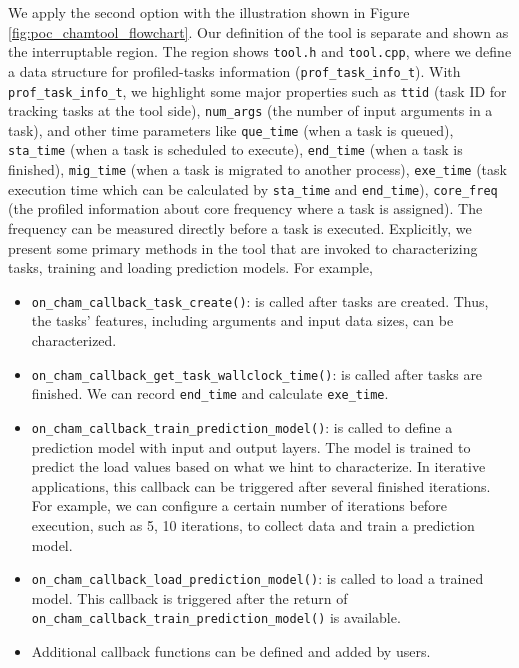 We apply the second option with the illustration shown in Figure \ref{fig:poc_chamtool_flowchart}. Our definition of the tool is separate and shown as the interruptable region. The region shows \texttt{tool.h} and \texttt{tool.cpp}, where we define a data structure for profiled-tasks information (\texttt{prof\_task\_info\_t}). With \texttt{prof\_task\_info\_t}, we highlight some major properties such as \texttt{ttid} (task ID for tracking tasks at the tool side), \texttt{num\_args} (the number of input arguments in a task), and other time parameters like \texttt{que\_time} (when a task is queued), \texttt{sta\_time} (when a task is scheduled to execute), \texttt{end\_time} (when a task is finished), \texttt{mig\_time} (when a task is migrated to another process), \texttt{exe\_time} (task execution time which can be calculated by \texttt{sta\_time} and \texttt{end\_time}), \texttt{core\_freq} (the profiled information about core frequency where a task is assigned). The frequency can be measured directly before a task is executed. Explicitly, we present some primary methods in the tool that are invoked to characterizing tasks, training and loading prediction models. For example,
\begin{itemize}
	\item \texttt{on\_cham\_callback\_task\_create()}: is called after tasks are created. Thus, the tasks' features, including arguments and input data sizes, can be characterized.
	\item \texttt{on\_cham\_callback\_get\_task\_wallclock\_time()}: is called after tasks are finished. We can record \texttt{end\_time} and calculate \texttt{exe\_time}.
	\item \texttt{on\_cham\_callback\_train\_prediction\_model()}: is called to define a prediction model with input and output layers. The model is trained to predict the load values based on what we hint to characterize. In iterative applications, this callback can be triggered after several finished iterations. For example, we can configure a certain number of iterations before execution, such as 5, 10 iterations, to collect data and train a prediction model.
	\item \texttt{on\_cham\_callback\_load\_prediction\_model()}: is called to load a trained model. This callback is triggered after the return of \texttt{on\_cham\_callback\_train\_prediction\_model()} is available.
	\item Additional callback functions can be defined and added by users.
\end{itemize}

